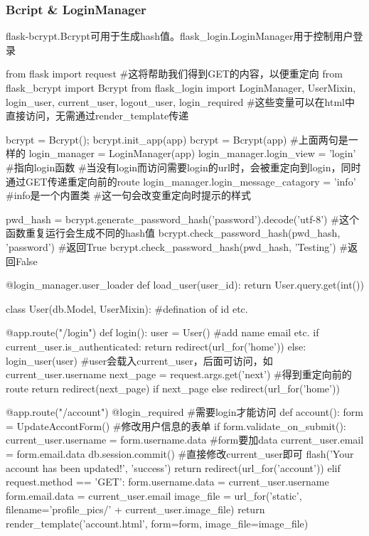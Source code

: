     \subsubsection{Bcript \& LoginManager}
      flask-bcrypt.Bcrypt可用于生成hash值。flask\_login.LoginManager用于控制用户登录
      \begin{codeblock}[language=python, caption={Using Bcript in app.py}]
        from flask import request #这将帮助我们得到GET的内容，以便重定向
        from flask_bcrypt import Bcrypt
        from flask_login import LoginManager, UserMixin, login_user, 
                                current_user, logout_user, login_required
            #这些变量可以在html中直接访问，无需通过render\_template传递

        bcrypt = Bcrypt(); bcrypt.init_app(app)
        bcrypt = Bcrypt(app) #上面两句是一样的
        login_manager = LoginManager(app)
        login_manager.login_view = 'login' #指向login函数
        #当没有login而访问需要login的url时，会被重定向到login，同时通过GET传递重定向前的route
        login_manager.login_message_catagory = 'info' #info是一个内置类
        #这一句会改变重定向时提示的样式

        pwd_hash = bcrypt.generate_password_hash('password').decode('utf-8') 
            #这个函数重复运行会生成不同的hash值
        bcrypt.check_password_hash(pwd_hash, 'password') #返回True
        bcrypt.check_password_hash(pwd_hash, 'Testing') #返回False

        @login_manager.user_loader
        def load_user(user_id):
            return User.query.get(int())

        class User(db.Model, UserMixin):
            #defination of id etc.

        @app.route("/login")
        def login():
          user = User() #add name email etc.  
          if current_user.is_authenticated:
              return redirect(url_for('home'))
          else:
              login_user(user) #user会载入current\_user，后面可访问，如current\_user.username
              next_page = request.args.get('next') #得到重定向前的route
              return redirect(next_page) if next_page else redirect(url_for('home'))

        @app.route("/account")
        @login_required #需要login才能访问
        def account():
            form = UpdateAccontForm() #修改用户信息的表单
            if form.validate_on_submit():
                current_user.username = form.username.data #form要加data
                current_user.email = form.email.data
                db.session.commit() #直接修改current\_user即可
                flash('Your account has been updated!', 'success')
                return redirect(url_for('account'))
            elif request.method == 'GET':
                form.username.data = current_user.username
                form.email.data = current_user.email
            image_file = url_for('static', 
                filename='profile_pics/' + current_user.image_file)
            return render_template('account.html', form=form, image_file=image_file)
      \end{codeblock}

